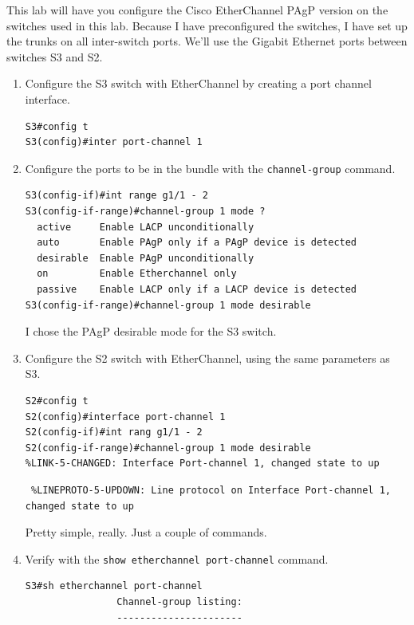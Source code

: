 \documentclass[b5paper,11pt]{memoir}
\begin{document}
This lab will have you configure the Cisco EtherChannel PAgP version on
the switches used in this lab. Because I have preconfigured the
switches, I have set up the trunks on all inter-switch ports. We'll use
the Gigabit Ethernet ports between switches S3 and S2.

\begin{enumerate}
\item
  Configure the S3 switch with EtherChannel by creating a port channel
  interface.

\begin{verbatim}
S3#config t
S3(config)#inter port-channel 1
\end{verbatim}
\item
  Configure the ports to be in the bundle with the
  \texttt{channel-group} command.

\begin{verbatim}
S3(config-if)#int range g1/1 - 2
S3(config-if-range)#channel-group 1 mode ?
  active     Enable LACP unconditionally
  auto       Enable PAgP only if a PAgP device is detected
  desirable  Enable PAgP unconditionally
  on         Enable Etherchannel only
  passive    Enable LACP only if a LACP device is detected
S3(config-if-range)#channel-group 1 mode desirable
\end{verbatim}

  I chose the PAgP desirable mode for the S3 switch.
\item
  Configure the S2 switch with EtherChannel, using the same parameters
  as S3.

\begin{verbatim}
S2#config t
S2(config)#interface port-channel 1
S2(config-if)#int rang g1/1 - 2
S2(config-if-range)#channel-group 1 mode desirable
%LINK-5-CHANGED: Interface Port-channel 1, changed state to up
\end{verbatim}

\begin{verbatim}
 %LINEPROTO-5-UPDOWN: Line protocol on Interface Port-channel 1, changed state to up
\end{verbatim}

  Pretty simple, really. Just a couple of commands.
\item
  Verify with the \texttt{show\ etherchannel\ port-channel} command.

\begin{verbatim}
S3#sh etherchannel port-channel
                Channel-group listing:
                ----------------------


\end{verbatim}
\end{enumerate}
\end{document}
